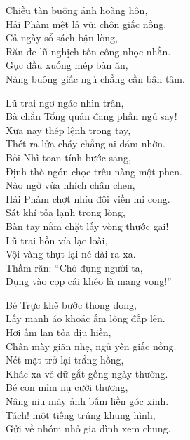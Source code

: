 \documentclass[../main.tex]{subfiles}
\begin{document}
\omk

\begin{center}
    Chiều tàn buông ánh hoàng hôn,\\
    Hải Phàm mệt lả vùi chôn giấc nồng.\\
    Cả ngày sổ sách bận lòng,\\
    Răn đe lũ nghịch tốn công nhọc nhằn.\\
    Gục đầu xuống mép bàn ăn,\\
    Nàng buông giấc ngủ chẳng cần bận tâm.

    Lũ trai ngơ ngác nhìn trân,\\
    Bà chằn Tổng quản đang phần ngủ say!\\
    Xưa nay thép lệnh trong tay,\\
    Thét ra lửa cháy chẳng ai dám nhờn.\\
    Bối Nhĩ toan tính bước sang,\\
    Định thò ngón chọc trêu nàng một phen.\\
    Nào ngờ vừa nhích chân chen,\\
    Hải Phàm chợt nhíu đôi viền mi cong.\\
    Sát khí tỏa lạnh trong lòng,\\
    Bàn tay nắm chặt lấy vòng thước gai!\\
    Lũ trai hồn vía lạc loài,\\
    Vội vàng thụt lại né dài ra xa.\\
    Thầm răn: ``Chớ đụng người ta,\\
    Đụng vào cọp cái khéo là mạng vong!''

    Bé Trực khẽ bước thong dong,\\
    Lấy manh áo khoác ấm lòng đắp lên.\\
    Hơi ấm lan tỏa dịu hiền,\\
    Chân mày giãn nhẹ, ngủ yên giấc nồng.\\
    Nét mặt trở lại trắng hồng,\\
    Khác xa vẻ dữ gắt gồng ngày thường.\\
    Bé con mỉm nụ cười thương,\\
    Nâng niu máy ảnh bấm liền góc xinh.\\
    Tách! một tiếng trúng khung hình,\\
    Gửi về nhóm nhỏ gia đình xem chung.


\end{center}
\end{document}
